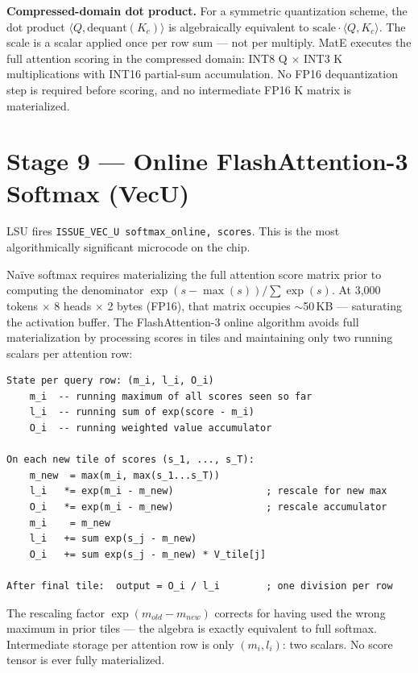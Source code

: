 \documentclass[11pt,letterpaper]{article}
\begin{document}
\textbf{Compressed-domain dot product.} For a symmetric quantization scheme, the dot product
$\langle Q, \mathrm{dequant}(K_c) \rangle$ is algebraically equivalent to
$\mathrm{scale} \cdot \langle Q, K_c \rangle$. The scale is a scalar applied once per row sum
--- not per multiply. MatE executes the full attention scoring in the compressed domain:
INT8 Q $\times$ INT3 K multiplications with INT16 partial-sum accumulation. No FP16
dequantization step is required before scoring, and no intermediate FP16 K matrix is
materialized.

\section{Stage 9 --- Online FlashAttention-3 Softmax (VecU)}

LSU fires \texttt{ISSUE\_VEC\_U softmax\_online, scores}. This is the most algorithmically
significant microcode on the chip.

Na\"ive softmax requires materializing the full attention score matrix prior to computing the
denominator $\exp(s - \max(s)) / \sum \exp(s)$. At 3{,}000 tokens $\times$ 8 heads $\times$ 2
bytes (FP16), that matrix occupies $\sim$50\,KB --- saturating the activation buffer. The
FlashAttention-3 online algorithm avoids full materialization by processing scores in tiles
and maintaining only two running scalars per attention row:

\begin{lstlisting}
State per query row: (m_i, l_i, O_i)
    m_i  -- running maximum of all scores seen so far
    l_i  -- running sum of exp(score - m_i)
    O_i  -- running weighted value accumulator

On each new tile of scores (s_1, ..., s_T):
    m_new  = max(m_i, max(s_1...s_T))
    l_i   *= exp(m_i - m_new)                ; rescale for new max
    O_i   *= exp(m_i - m_new)                ; rescale accumulator
    m_i    = m_new
    l_i   += sum exp(s_j - m_new)
    O_i   += sum exp(s_j - m_new) * V_tile[j]

After final tile:  output = O_i / l_i        ; one division per row
\end{lstlisting}

The rescaling factor $\exp(m_{old} - m_{new})$ corrects for having used the wrong maximum in
prior tiles --- the algebra is exactly equivalent to full softmax. Intermediate storage per
attention row is only $(m_i, l_i)$: two scalars. No score tensor is ever fully materialized.
\end{document}
